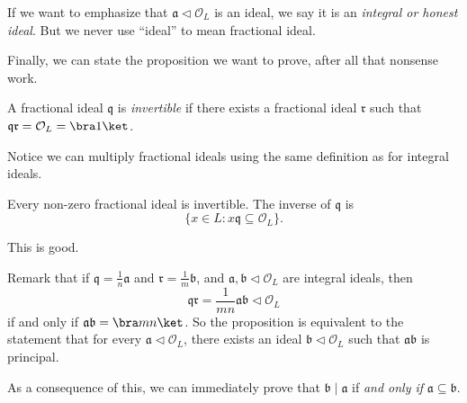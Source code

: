 \documentclass[a4paper]{article}
\begin{document}
\begin{defi}
  If we want to emphasize that $\mathfrak{a} \lhd \mathcal{O}_L$ is an ideal, we say it is an \emph{integral or honest ideal}. But we never use ``ideal'' to mean fractional ideal.
\end{defi}

Finally, we can state the proposition we want to prove, after all that nonsense work.

\begin{defi}
  A fractional ideal $\mathfrak{q}$ is \emph{invertible} if there exists a fractional ideal $\mathfrak{r}$ such that $\mathfrak{q}\mathfrak{r} = \mathcal{O}_L = \bra 1\ket$.
\end{defi}
Notice we can multiply fractional ideals using the same definition as for integral ideals.

\begin{prop}
  Every non-zero fractional ideal is invertible. The inverse of $\mathfrak{q}$ is
  \[
    \{x \in L: x\mathfrak{q} \subseteq \mathcal{O}_L\}.
  \]
\end{prop}
This is good.

Remark that if $\mathfrak{q} = \frac{1}{n} \mathfrak{a}$ and $\mathfrak{r} = \frac{1}{m} \mathfrak{b}$, and $\mathfrak{a}, \mathfrak{b} \lhd \mathcal{O}_L$ are integral ideals, then
\[
  \mathfrak{q} \mathfrak{r} = \frac{1}{mn} \mathfrak{a}\mathfrak{b} \lhd \mathcal{O}_L
\]
if and only if $\mathfrak{a}\mathfrak{b} = \bra mn\ket$. So the proposition is equivalent to the statement that for every $\mathfrak{a} \lhd \mathcal{O}_L$, there exists an ideal $\mathfrak{b} \lhd \mathcal{O}_L$ such that $\mathfrak{a}\mathfrak{b}$ is principal.

As a consequence of this, we can immediately prove that $\mathfrak{b} \mid \mathfrak{a}$ if \emph{and only if} $\mathfrak{a} \subseteq \mathfrak{b}$.
\end{document}
